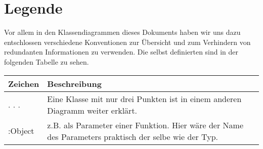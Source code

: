 \documentclass[entwurf.tex]{subfiles}
\begin{document}
\section{Legende}
Vor allem in den Klassendiagrammen dieses Dokuments haben wir uns dazu entschlossen verschiedene Konventionen zur Übersicht und zum Verhindern von redundanten Informationen zu verwenden. Die selbst definierten sind in der folgenden Tabelle zu sehen.

\begin{tabularx}{\textwidth}{ l|X }
	Zeichen	& Beschreibung\\
	\hline
	. . .	& Eine Klasse mit nur drei Punkten ist in einem anderen Diagramm weiter erklärt.\\
	:Object	& z.B. als Parameter einer Funktion. Hier wäre der Name des Parameters praktisch der selbe wie der Typ.\\
\end{tabularx}
\end{document}
